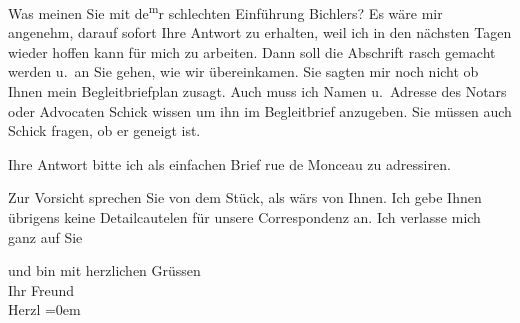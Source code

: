 \pstart
           Was meinen Sie mit de\substVorne{}\textsuperscript{m}\substDazwischen{}r\substHinten{} schlechten  Einführung Bichlers? Es wäre
               mir angenehm, darauf sofort Ihre Antwort zu erhalten, weil ich in den nächsten Tagen
               wieder hoffen kann für mich zu arbeiten. Dann soll die Abschrift rasch gemacht werden u. an Sie
               gehen, wie wir übereinkamen. Sie sagten mir noch nicht ob Ihnen mein Begleitbriefplan
               zusagt. Auch muss {\pb}ich Namen u. Adresse
               des Notars oder Advocaten Schick wissen um ihn
               im Begleitbrief anzugeben. Sie müssen auch Schick fragen, ob er geneigt ist.\pend
           
\pstart
           Ihre Antwort bitte ich als einfachen Brief rue de
                  Monceau zu adressiren.\pend
           
\pstart
           Zur Vorsicht sprechen Sie von  dem Stück, als wärs von Ihnen. Ich
               gebe Ihnen übrigens keine Detailcautelen für unsere Correspondenz an. Ich verlasse
               mich ganz auf Sie\pend
           
\pstart
           und bin mit herzlichen Grüssen{\\[\baselineskip]} Ihr Freund{\\[\baselineskip]}\spacefill\mbox{Herzl}\pend
           \leftskip=0em{}\endnumbering{}
\begin{anhang}
\end{anhang}\newcommand{\dateiname}{L03837}\newcommand{\titel}{Theodor Herzl an Arthur Schnitzler, 27. 11. 1894}\newcommand{\editorInnen}{Selma Jahnke und Martin Anton Müller}
